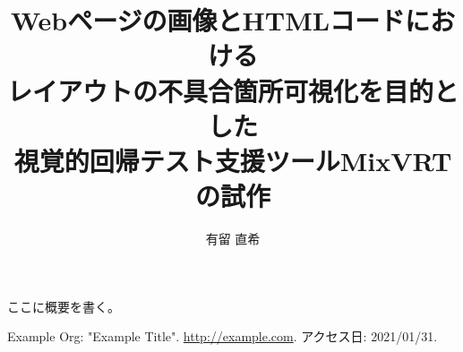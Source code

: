 \documentclass[uplatex, report, a4j, 10pt]{jsbook}
\title{Webページの画像とHTMLコードにおける\\レイアウトの不具合箇所可視化を目的とした\\視覚的回帰テスト支援ツールMixVRTの試作}
\author{有留 直希}
\begin{document}
\maketitle

%
% 
ここに概要を書く。


%
% 








%


%
\begin{thebibliography}{0}
	Example Org: "Example Title". \url{http://example.com}. アクセス日: 2021/01/31.
\end{thebibliography}

\end{document}

